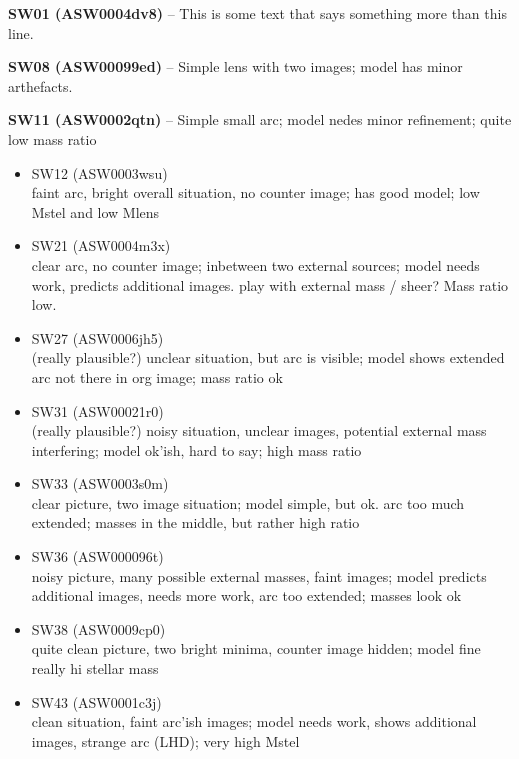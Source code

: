 \documentclass[fleqn,usenatbib]{mnras}
\newcommand{\lenstitle}[1]{\noindent\textbf{#1} --}
\begin{document}
\lenstitle{SW01 (ASW0004dv8)}
  This is some text that says something more than this line.

\lenstitle{SW08 (ASW00099ed)}
  Simple lens with two images;
  model has minor arthefacts.

\lenstitle{SW11 (ASW0002qtn)}
  Simple small arc;
  model nedes minor refinement;
  quite low mass ratio
  
\begin{itemize}
  \item SW12 (ASW0003wsu) \\
  faint arc, bright overall situation, no counter image;
  has good model;
  low Mstel and low Mlens
  
  \item SW21 (ASW0004m3x) \\
  clear arc, no counter image; inbetween two external sources;
  model needs work, predicts additional images. play with external mass / sheer?
  Mass ratio low.
  
  \item SW27 (ASW0006jh5) \\
  (really plausible?)
  unclear situation, but arc is visible;
  model shows extended arc not there in org image;
  mass ratio ok
  
  \item SW31 (ASW00021r0) \\
  (really plausible?)
  noisy situation, unclear images, potential external mass interfering;
  model ok'ish, hard to say;
  high mass ratio
  
  \item SW33 (ASW0003s0m)\\
  clear picture, two image situation;
  model simple, but ok. arc too much extended;
  masses in the middle, but rather high ratio
  
  \item SW36 (ASW000096t) \\
  noisy picture, many possible external masses, faint images;
  model predicts additional images, needs more work, arc too extended;
  masses look ok
  
  \item SW38 (ASW0009cp0) \\
  quite clean picture, two bright minima, counter image hidden;
  model fine
  really hi stellar mass
  
  \item SW43 (ASW0001c3j) \\
  clean situation, faint arc'ish images;
  model needs work, shows additional images, strange arc (LHD);
  very high Mstel
  

\end{itemize}
\end{document}
